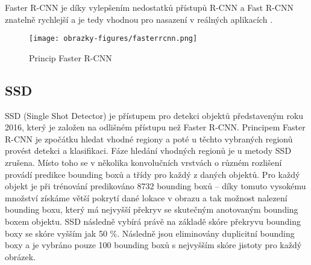 Faster R-CNN je díky vylepšením nedostatků přístupů R-CNN a Fast R-CNN znatelně rychlejší a je tedy vhodnou pro nasazení v reálných aplikacích \cite{ObjectDetectionAlgorithms}.

\begin{figure}[!htbp]
    \centering
    \texttt{[image: obrazky-figures/fasterrcnn.png]}
    \caption{Princip Faster R-CNN \cite{ObjectDetectionAlgorithms}}
\end{figure} 

\subsection*{SSD}

\iffalse
SSD (Single Shot Detector) je přístupem z roku 2016 pro detekci objektů, která je založena na odlišném principu než Faster R-CNN. Ve Faster R-CNN je hledání vhodných regionů a klasifikace daných regionů rozdělena, v SSD je fáze hledání vhodných regionů zrušena a metoda využívá pouze jednu konvoluční neuronovou síť. Celý vstupní obraz je na začátku přiveden na vstup konvoluční neuronové sítě. Mapy rysů jsou získány v různých měřítkách. Pomocí 3 $\times$ 3 konvolučního filtru jsou vytvořené na mapách rysů bounding boxy definující daný objekt. Najednou je definovaná hranice objektu a i jeho klasifikace do třídy. Bounding boxy se nacházejí na každé z aktivačních map a proto může být detekce provedena na objektech různého měřítka. Síť dokáže tedy získat predikce z map rysů s různě vysokým rozlišením a tak predikovat objekty rozličných velikostí. Při predikci je vypočítáno skóre pro přítomnost každé třídy pro daný objekt a offset bounding boxu pro to, aby dané ohraničení lépe odpovídalo reálnému tvaru objektu. SSD je přístupem, který zvláště díky více vrstvám pro predikci v různých měřítkách objektu, dosahuje dobré přesnosti za snížení trénovacího času a může být tedy nasazeným v reálných aplikacích \cite{SSD, SSDFasterR-CNNComparison}.
\fi

SSD (Single Shot Detector) je přístupem pro detekci objektů představeným roku 2016, který je založen na odlišném přístupu než Faster R-CNN. Principem Faster R-CNN je zpočátku hledat vhodné regiony a poté u těchto vybraných regionů provést detekci a klasifikaci. Fáze hledání vhodných regionů je u metody SSD zrušena. Místo toho se v několika konvolučních vrstvách o různém rozlišení provádí predikce bounding boxů a třídy pro každý z daných objektů. Pro každý objekt je při trénování predikováno 8732 bounding boxů -- díky tomuto vysokému množství získáme větší pokrytí dané lokace v obrazu a tak možnost nalezení bounding boxu, který má nejvyšší překryv se skutečným anotovaným bounding boxem objektu. SSD následně vybírá právě na základě skóre překryvu bounding boxy se skóre vyšším jak 50 \%. Následně jsou eliminovány duplicitní bounding boxy a je vybráno pouze 100 bounding boxů s nejvyšším skóre jistoty pro každý obrázek.

